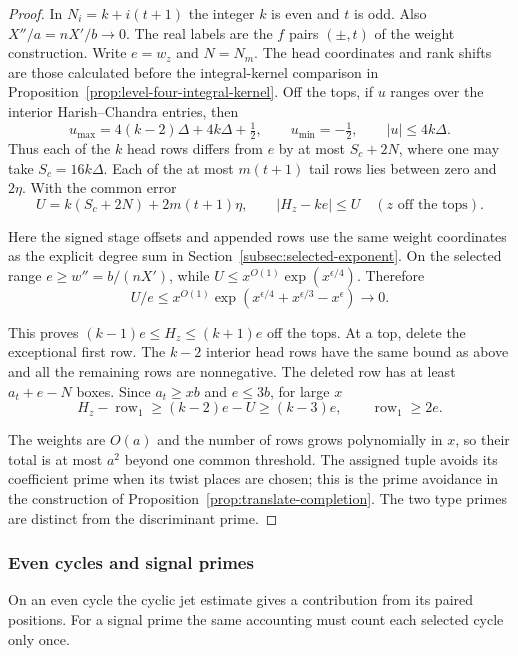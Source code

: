 \begin{proof}
In \(N_i=k+i(t+1)\) the integer \(k\) is even and \(t\) is odd.
Also \(X''/a=nX'/b\to0\). The real labels are the \(f\) pairs
\((\pm,t)\) of the weight construction. Write \(e=w_z\) and \(N=N_m\). The head coordinates and rank shifts
are those calculated before the integral-kernel comparison in
Proposition~\ref{prop:level-four-integral-kernel}. Off the tops, if \(u\) ranges over the interior Harish--Chandra entries, then
\[
 u_{\max}=4(k-2)\Delta+4k\Delta+\tfrac12,\qquad
 u_{\min}=-\tfrac12,\qquad |u|\le4k\Delta .
\] Thus each of the \(k\)
head rows differs from \(e\) by at most \(S_c+2N\), where one may take
\(S_c=16k\Delta\). Each of the at most \(m(t+1)\) tail rows lies
between zero and \(2\eta\). With the common error
\[
 U=k(S_c+2N)+2m(t+1)\eta,\qquad |H_z-ke|\le U
          \quad(z\text{ off the tops}) .
\]

Here the signed stage offsets and appended rows use the same weight
coordinates as the explicit degree sum in Section~\ref{subsec:selected-exponent}.
On the selected range \(e\ge w''=b/(nX')\), while
\(U\le x^{O(1)}\exp(x^{\epsilon/4})\). Therefore
\[
 U/e\le x^{O(1)}
       \exp(x^{\epsilon/4}+x^{\epsilon/3}-x^\epsilon)\longrightarrow0 .
\]

This proves \((k-1)e\le H_z\le(k+1)e\) off the tops. At a top, delete
the exceptional first row. The \(k-2\) interior head rows have the same
bound as above and all the remaining rows are nonnegative. The deleted
row has at least \(a_t+e-N\) boxes. Since \(a_t\ge xb\) and \(e\le3b\),
for large \(x\)
\[
 H_z-\operatorname{row}_1\ge(k-2)e-U\ge(k-3)e,\qquad
 \operatorname{row}_1\ge2e .
\]

The weights are \(O(a)\) and the number of rows grows polynomially
in \(x\), so their total is at most \(a^2\) beyond one common threshold.
The assigned tuple avoids its coefficient prime when its twist places
are chosen; this is the prime avoidance in the construction of
Proposition~\ref{prop:translate-completion}. The two type primes are
distinct from the discriminant prime.
\end{proof}



\subsubsection{Even cycles and signal primes}

On an even cycle the cyclic jet estimate gives a contribution from its paired positions. For a signal prime the same accounting must count each selected cycle only once.

